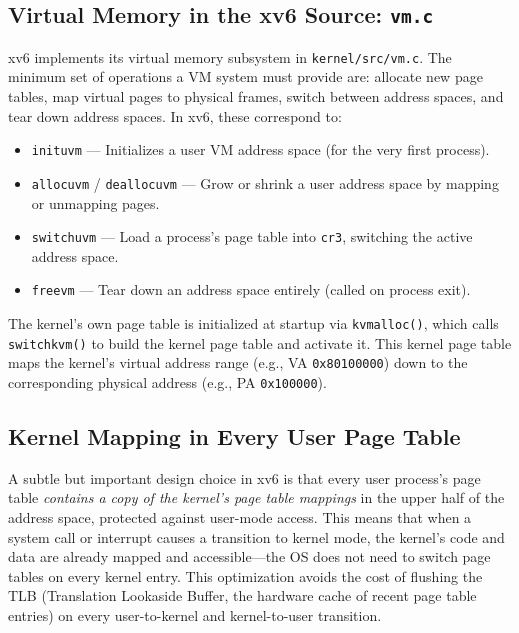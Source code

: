 \documentclass[11pt]{article}
\begin{document}
\subsection{Virtual Memory in the xv6 Source: \texttt{vm.c}}

xv6 implements its virtual memory subsystem in \texttt{kernel/src/vm.c}. The minimum set of operations a VM system must provide are: allocate new page tables, map virtual pages to physical frames, switch between address spaces, and tear down address spaces. In xv6, these correspond to:

\begin{itemize}
    \item \texttt{inituvm} --- Initializes a user VM address space (for the very first process).
    \item \texttt{allocuvm} / \texttt{deallocuvm} --- Grow or shrink a user address space by mapping or unmapping pages.
    \item \texttt{switchuvm} --- Load a process's page table into \texttt{cr3}, switching the active address space.
    \item \texttt{freevm} --- Tear down an address space entirely (called on process exit).
\end{itemize}

The kernel's own page table is initialized at startup via \texttt{kvmalloc()}, which calls \texttt{switchkvm()} to build the kernel page table and activate it. This kernel page table maps the kernel's virtual address range (e.g., VA \texttt{0x80100000}) down to the corresponding physical address (e.g., PA \texttt{0x100000}).

\subsection{Kernel Mapping in Every User Page Table}

A subtle but important design choice in xv6 is that every user process's page table \emph{contains a copy of the kernel's page table mappings} in the upper half of the address space, protected against user-mode access. This means that when a system call or interrupt causes a transition to kernel mode, the kernel's code and data are already mapped and accessible---the OS does not need to switch page tables on every kernel entry. This optimization avoids the cost of flushing the TLB (Translation Lookaside Buffer, the hardware cache of recent page table entries) on every user-to-kernel and kernel-to-user transition.
\end{document}
